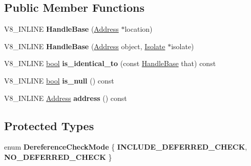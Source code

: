 \subsection*{Public Member Functions}
\begin{DoxyCompactItemize}
\item 
\mbox{\label{classv8_1_1internal_1_1HandleBase_a2f4b4f5eec7fab5987e24f2adab385cb}} 
V8\+\_\+\+I\+N\+L\+I\+NE {\bfseries Handle\+Base} (\mbox{\hyperlink{classuintptr__t}{Address}} $\ast$location)
\item 
\mbox{\label{classv8_1_1internal_1_1HandleBase_a6ba15aea5ab1331eb27a03d1bb17d33f}} 
V8\+\_\+\+I\+N\+L\+I\+NE {\bfseries Handle\+Base} (\mbox{\hyperlink{classuintptr__t}{Address}} object, \mbox{\hyperlink{classv8_1_1internal_1_1Isolate}{Isolate}} $\ast$isolate)
\item 
\mbox{\label{classv8_1_1internal_1_1HandleBase_ab08834872d558cd59de22d21edd72c48}} 
V8\+\_\+\+I\+N\+L\+I\+NE \mbox{\hyperlink{classbool}{bool}} {\bfseries is\+\_\+identical\+\_\+to} (const \mbox{\hyperlink{classv8_1_1internal_1_1HandleBase}{Handle\+Base}} that) const
\item 
\mbox{\label{classv8_1_1internal_1_1HandleBase_a34e71ca5684e08cca0c00c22edc78334}} 
V8\+\_\+\+I\+N\+L\+I\+NE \mbox{\hyperlink{classbool}{bool}} {\bfseries is\+\_\+null} () const
\item 
\mbox{\label{classv8_1_1internal_1_1HandleBase_a4c9d35ec2677062d4a735144396f0304}} 
V8\+\_\+\+I\+N\+L\+I\+NE \mbox{\hyperlink{classuintptr__t}{Address}} {\bfseries address} () const
\end{DoxyCompactItemize}
\subsection*{Protected Types}
\begin{DoxyCompactItemize}
\item 
\mbox{\label{classv8_1_1internal_1_1HandleBase_ab0cd4ff6a70655c61c64853353d14121}} 
enum {\bfseries Dereference\+Check\+Mode} \{ {\bfseries I\+N\+C\+L\+U\+D\+E\+\_\+\+D\+E\+F\+E\+R\+R\+E\+D\+\_\+\+C\+H\+E\+CK}, 
{\bfseries N\+O\+\_\+\+D\+E\+F\+E\+R\+R\+E\+D\+\_\+\+C\+H\+E\+CK}
 \}
\end{DoxyCompactItemize}

